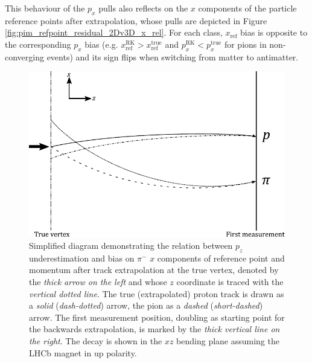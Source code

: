 This behaviour of the $p_x$ pulls also reflects on the $x$ components of the particle reference points after extrapolation, whose pulls are depicted in Figure \ref{fig:pim_refpoint_residual_2Dv3D_x_rel}.
For each class, $x_\text{ref}$ bias is opposite to the corresponding $p_x$ bias (e.g. $x_\text{ref}^\text{RK} > x_\text{ref}^\text{true}$ and $p_x^\text{RK} < p_x^\text{true}$ for pions in non-converging \lambdadecay events) and its sign flips when switching from matter to antimatter.

\begin{figure}[t]
	\centering	
	\includegraphics[width=.8\textwidth]{graphics/03-vertex_reconstruction/pim_bias_diagram_closing.pdf}
	\caption{Simplified \lambdadecay diagram demonstrating the relation between $p_z$ underestimation and bias on $\pi^-$ $x$ components of reference point and momentum after track extrapolation at the true vertex, denoted by the \textit{thick arrow on the left} and whose $z$ coordinate is traced with the \textit{vertical dotted line}.
	The true (extrapolated) proton track is drawn as a \textit{solid} (\textit{dash-dotted}) arrow, the pion as a \textit{dashed} (\textit{short-dashed}) arrow.
	The first measurement position, doubling as starting point for the backwards extrapolation, is marked by the \textit{thick vertical line on the right}.
	The decay is shown in the $xz$ bending plane assuming the LHCb magnet in up polarity.}
	\label{fig:3:pion_biases_diagram}
\end{figure}

